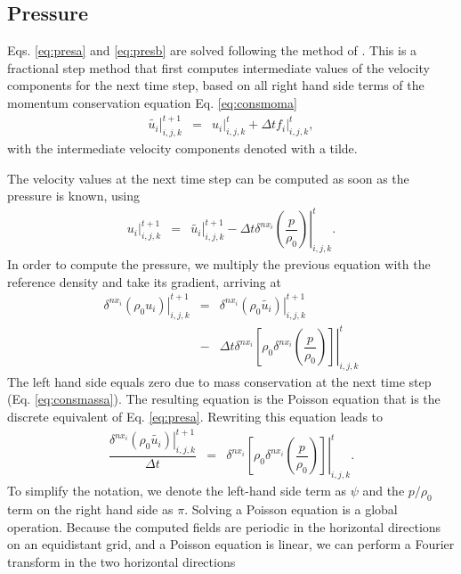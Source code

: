 \documentclass[gmd]{copernicus}
\begin{document}
\subsection{Pressure}
Eqs. \ref{eq:presa} and \ref{eq:presb} are solved following the method of \citet{Chorin1968}. This is a fractional step method that first computes intermediate values of the velocity components for the next time step, based on all right hand side terms of the momentum conservation equation Eq. \ref{eq:consmoma}
\begin{eqnarray}
\left. \widetilde{u_i} \right|^{t+1}_{i,j,k} & = & \left. u_i \right|^{t}_{i,j,k} + \Delta t \left. f_i \right|^{t}_{i,j,k},
\end{eqnarray}
with the intermediate velocity components denoted with a tilde.

The velocity values at the next time step can be computed as soon as the pressure is known, using
\begin{eqnarray}
\left. u_i\right|^{t+1}_{i,j,k} & = & \left. \widetilde{u_i} \right|^{t+1}_{i,j,k} - \Delta t \left. \delta^{nx_i}\left( \dfrac{p}{\rho_0}\right)\right|^t_{i,j,k}.
\end{eqnarray}
In order to compute the pressure, we multiply the previous equation with the reference density and take its gradient, arriving at
\begin{eqnarray}
\nonumber \left. \delta^{nx_i} \left( \rho_0 u_i\right) \right|^{t+1}_{i,j,k} & = & 
\left. \delta^{nx_i} \left( \rho_0 \widetilde{u_i} \right) \right|^{t+1}_{i,j,k}\\
& - &  \Delta t \left.\delta^{nx_i} \left[ \rho_0 \delta^{nx_i}\left( \dfrac{p}{\rho_0}\right) \right] \right|^t_{i,j,k}
\end{eqnarray}
The left hand side equals zero due to mass conservation at the next time step (Eq. \ref{eq:consmassa}). The resulting equation is the Poisson equation that is the discrete equivalent of Eq. \ref{eq:presa}. Rewriting this equation leads to
\begin{eqnarray}
\dfrac{\left. \delta^{nx_i} \left( \rho_0 \widetilde{u_i} \right) \right|^{t+1}_{i,j,k}}{\Delta t}
& = &  \left. \delta^{nx_i} \left[ \rho_0 \delta^{nx_i}\left( \dfrac{p}{\rho_0}\right) \right] \right|^t_{i,j,k}.
\end{eqnarray}
To simplify the notation, we denote the left-hand side term as $\psi$ and the $p / \rho_0$ term on the right hand side as $\pi$. Solving a Poisson equation is a global operation. Because the computed fields are periodic in the horizontal directions on an equidistant grid, and a Poisson equation is linear, we can perform a Fourier transform in the two horizontal directions
\end{document}

